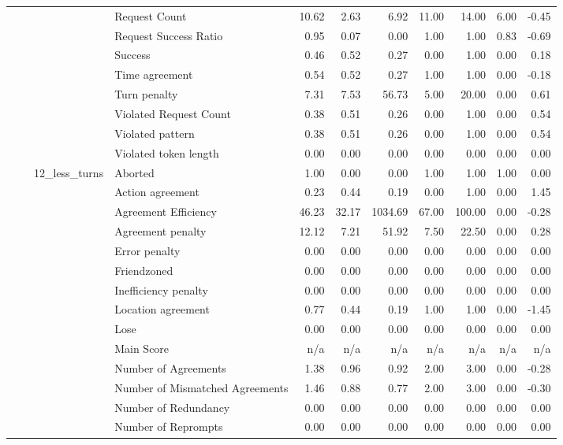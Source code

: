 \begin{tabular}{llllrrrrrrr}
 &  &  & Request Count & 10.62 & 2.63 & 6.92 & 11.00 & 14.00 & 6.00 & -0.45 \\
 &  &  & Request Success Ratio & 0.95 & 0.07 & 0.00 & 1.00 & 1.00 & 0.83 & -0.69 \\
 &  &  & Success & 0.46 & 0.52 & 0.27 & 0.00 & 1.00 & 0.00 & 0.18 \\
 &  &  & Time agreement & 0.54 & 0.52 & 0.27 & 1.00 & 1.00 & 0.00 & -0.18 \\
 &  &  & Turn penalty & 7.31 & 7.53 & 56.73 & 5.00 & 20.00 & 0.00 & 0.61 \\
 &  &  & Violated Request Count & 0.38 & 0.51 & 0.26 & 0.00 & 1.00 & 0.00 & 0.54 \\
 &  &  & Violated pattern & 0.38 & 0.51 & 0.26 & 0.00 & 1.00 & 0.00 & 0.54 \\
 &  &  & Violated token length & 0.00 & 0.00 & 0.00 & 0.00 & 0.00 & 0.00 & 0.00 \\
\cline{3-11}
 &  & \multirow[t]{27}{*}{12_less_turns} & Aborted & 1.00 & 0.00 & 0.00 & 1.00 & 1.00 & 1.00 & 0.00 \\
 &  &  & Action agreement & 0.23 & 0.44 & 0.19 & 0.00 & 1.00 & 0.00 & 1.45 \\
 &  &  & Agreement Efficiency & 46.23 & 32.17 & 1034.69 & 67.00 & 100.00 & 0.00 & -0.28 \\
 &  &  & Agreement penalty & 12.12 & 7.21 & 51.92 & 7.50 & 22.50 & 0.00 & 0.28 \\
 &  &  & Error penalty & 0.00 & 0.00 & 0.00 & 0.00 & 0.00 & 0.00 & 0.00 \\
 &  &  & Friendzoned & 0.00 & 0.00 & 0.00 & 0.00 & 0.00 & 0.00 & 0.00 \\
 &  &  & Inefficiency penalty & 0.00 & 0.00 & 0.00 & 0.00 & 0.00 & 0.00 & 0.00 \\
 &  &  & Location agreement & 0.77 & 0.44 & 0.19 & 1.00 & 1.00 & 0.00 & -1.45 \\
 &  &  & Lose & 0.00 & 0.00 & 0.00 & 0.00 & 0.00 & 0.00 & 0.00 \\
 &  &  & Main Score & n/a & n/a & n/a & n/a & n/a & n/a & n/a \\
 &  &  & Number of Agreements & 1.38 & 0.96 & 0.92 & 2.00 & 3.00 & 0.00 & -0.28 \\
 &  &  & Number of Mismatched Agreements & 1.46 & 0.88 & 0.77 & 2.00 & 3.00 & 0.00 & -0.30 \\
 &  &  & Number of Redundancy & 0.00 & 0.00 & 0.00 & 0.00 & 0.00 & 0.00 & 0.00 \\
 &  &  & Number of Reprompts & 0.00 & 0.00 & 0.00 & 0.00 & 0.00 & 0.00 & 0.00 \\

\end{tabular}
